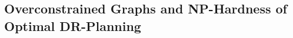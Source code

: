 \subsection{Overconstrained Graphs and NP-Hardness of Optimal DR-Planning}
\label{sec:drp:overconstrained}






\ClearMyMinHeight
{}

